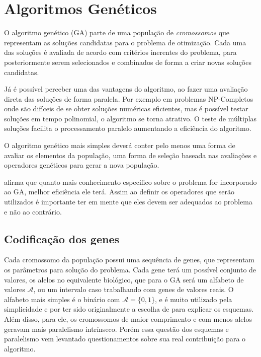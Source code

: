 
\chapter{Algoritmos Genéticos}
\label{chap:GA}

O algoritmo genético (GA) parte de uma população de \textit{cromossomos} que representam as soluções candidatas para o problema de otimização. Cada uma das soluções é avaliada de acordo com critérios inerentes do problema, para posteriormente serem selecionados e combinados de forma a criar novas soluções candidatas.

Já é possível perceber uma das vantagens do algoritmo, ao fazer uma avaliação direta das soluções de forma paralela. Por exemplo em problemas NP-Completos onde são difíceis de se obter soluções numéricas eficientes, mas é possível testar soluções em tempo polinomial, o algoritmo se torna atrativo. O teste de múltiplas soluções facilita o processamento paralelo aumentando a eficiência do algoritmo.

O algoritmo genético mais simples deverá conter pelo menos uma forma de avaliar os elementos da população, uma forma de seleção baseada nas avaliações e operadores genéticos para gerar a nova população.

\citeauthor{Linden2008} afirma que quanto mais conhecimento especifico sobre o problema for incorporado ao GA, melhor eficiência ele terá. Assim ao definir os operadores que serão utilizados é importante ter em mente que eles devem ser adequados ao problema e não ao contrário.

\section{Codificação dos genes}
Cada cromossomo da população possui uma sequência de genes, que representam os parâmetros para solução do problema. Cada gene terá um possível conjunto de valores, os alelos no equivalente biológico, que para o GA será um alfabeto de valores \( \mathcal{A}\), ou um intervalo caso trabalhando com genes de valores reais. O alfabeto mais simples é o binário com \(\mathcal{A} = \{0, 1\}\), e é muito utilizado pela simplicidade e por ter sido originalmente a escolha de \citeauthor{Holland1992} para explicar os esquemas. Além disso, para ele, os cromossomos de maior comprimento e com menos alelos geravam mais paralelismo intrínseco. Porém essa questão dos esquemas e paralelismo vem levantado questionamentos sobre sua real contribuição para o algoritmo. 


